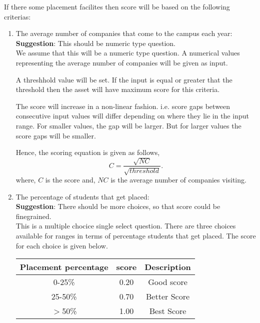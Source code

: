 \documentclass[oneside,twocolumn]{article}
\begin{document}
If there some placement facilites then score will be based on
the following criterias:
\begin{enumerate}
  \item The average number of companies that come to the
  campus each year: \\
  \textbf{Suggestion}: This should be numeric type question. \\

  We assume that this will be a numeric type question. A numerical
  values representing the average number of companies will be
  given as input.

  A threshhold value will be set. If the input is equal or greater
  that the threshold then the asset will have maximum score
  for this criteria. 

  The score will increase in a non-linear fashion. i.e. score
  gaps between consecutive input values will differ depending
  on where they lie in the input range. For smaller values, the
  gap will be larger. But for larger values the score gaps will
  be smaller.

  Hence, the scoring equation is given as follows,
  \[
	C = \dfrac{\sqrt{NC}}{\sqrt{threshold}}.
  \]
  where, \(C\) is the score and, \(NC\) is the average number of companies
  visiting.

  \item The percentage of students that get placed: \\
  \textbf{Suggestion}: There should be more choices, so that
  score could be finegrained. \\  

  This is a multiple chocice single select question. There are
  three choices available for ranges in terms of percentage
  students that get placed. The score for each choice is given
  below.
  \begin{center}
    \begin{tabular}{c | c | c} \hline
      Placement percentage & score & Description \\ \hline
      0-25\%		     & 0.20  & Good score \\
      25-50\%		     & 0.70  & Better Score \\
      \(>\)50\%	             & 1.00  & Best Score \\ \hline
    \end{tabular}
  \end{center}

  \end{enumerate}
\end{document}
